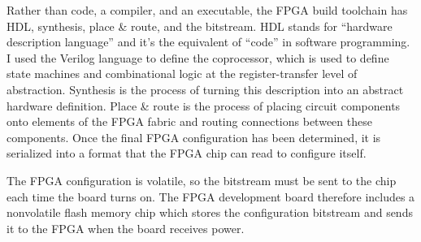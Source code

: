 Rather than code, a compiler, and an executable, the FPGA build toolchain has HDL, synthesis, place \& route, and the bitstream. HDL stands for ``hardware description language'' and it's the equivalent of ``code'' in software programming. I used the Verilog language to define the coprocessor, which is used to define state machines and combinational logic at the register-transfer level of abstraction. Synthesis is the process of turning this description into an abstract hardware definition. Place \& route is the process of placing circuit components onto elements of the FPGA fabric and routing connections between these components. Once the final FPGA configuration has been determined, it is serialized into a format that the FPGA chip can read to configure itself.\cite{IceStorm}

The FPGA configuration is volatile, so the bitstream must be sent to the chip each time the board turns on. The FPGA development board therefore includes a nonvolatile flash memory chip which stores the configuration bitstream and sends it to the FPGA when the board receives power.\cite{iCEBreaker}
